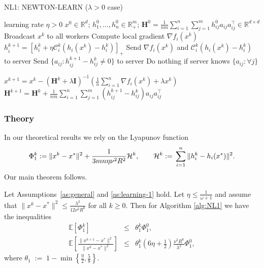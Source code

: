 \documentclass[12pt]{article}
\newcommand{\squeeze}{}
\newcommand{\eqdef}{\; { := }\;}
\newcommand{\R}{\mathbb{R}}
\newcommand{\newalpha}{h}
\newcommand{\mH}{\mathbf{H}}
\newcommand{\mI}{\mathbf{I}}
\newcommand{\cC}{{\mathcal{C}}}
\begin{document}
\begin{algorithm}[tb]
	\caption{{\sf NL1: NEWTON-LEARN} ($\lambda>0$ case)}
	\label{alg:NL1}
\begin{algorithmic}
		 learning rate $\eta>0$ 
		$x^0 \in \R^d$; $h^0_1,\dots, h^0_n \in \R^{m}_{+}$; $\mH^0 =  \frac{1}{nm} \sum \limits_{i=1}^n  \sum\limits_{j=1}^{m} h_{ij}^0 a_{ij}a_{ij}^\top\in \R^{d\times d}$
		\STATE Broadcast $x^k$ to all workers
		\STATE Compute local gradient $\nabla f_i(x^k)$ 
		\STATE $h^{k+1}_i = [h^k_i + \eta \cC_i^k (\newalpha_i(x^k) - h^k_i)]_+$ 
		\STATE Send $\nabla f_i(x^k)$ and $\cC_i^k (\newalpha_i(x^k) - h^k_i)$ to server 
		 Send $\{a_{ij} : h_{ij}^{k+1} - h_{ij}^k \neq 0\}$ to server
		 Do nothing if server knows $\{a_{ij} : \forall j\}$
		\ENDFOR
		
		\STATE $x^{k+1} = x^k - \left( \mH^k + \lambda \mI \right)^{-1} \left(  \frac{1}{n} \sum\limits_{i=1}^n \nabla f_i(x^k) + \lambda x^k  \right)$
		\STATE $\mH^{k+1} = \mH^k + \frac{1}{nm} \sum \limits_{i=1}^n  \sum\limits_{j=1}^{m} (h_{ij}^{k+1} - h_{ij}^k) a_{ij}a_{ij}^\top $
		\ENDFOR
\end{algorithmic}
\end{algorithm} 

\subsubsection{Theory}

In our theoretical results we rely on the Lyapunov function 
$$
\squeeze \Phi_1^k \eqdef \|x^{k} - x^*\|^2 + \frac{1}{3mn\eta  \nu^2 R^2} {\cal H}^{k}, \qquad {\cal H}^k \eqdef \sum_{i=1}^n \|h_i^k - \newalpha_i(x^*)\|^2. 
$$ Our main theorem follows.

\begin{theorem}[Convergence of {\sf NL1}]\label{th:lambda>0}
Let  Assumptions~\ref{as:general} and  \ref{as:learning-1} hold. Let $\eta\leq \frac{1}{\omega+1}$ and assume that $\|x^k - x^*\|^2 \leq \frac{\lambda^2}{12\nu^2R^6}$ for all $k\geq 0$. Then for Algorithm \ref{alg:NL1} we have the inequalities 
\begin{eqnarray*}
\squeeze
\mathbb{E}[\Phi_1^k] & \leq & \theta_1^k \Phi_1^0,\\
\squeeze  
\mathbb{E} \left[  \frac{\|x^{k+1} - x^*\|^2}{\|x^k - x^*\|^2 }  \right] & \leq &\theta_1^k  \left(  {6\eta} + \frac{1}{2}  \right) \frac{\nu^2 R^6}{\lambda^2} \Phi_1^0, 
\end{eqnarray*}
where $\theta_1 \eqdef    1 - \min \left\{  \frac{\eta}{2}, \frac{5}{8}  \right\} $.
\end{theorem}
\end{document}
